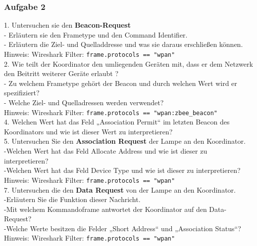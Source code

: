 \subsubsection{Aufgabe 2}
\begin{Fragen}
    1. Untersuchen sie den \textbf{Beacon-Request}\\
    - Erläutern sie den Frametype und den Command Identifier.\\ 
    - Erläutern die Ziel- und Quelladdresse und was sie daraus erschließen können.\\
    Hinweis: Wireshark Filter: \verb|frame.protocols == "wpan"|\\

    2. Wie teilt der Koordinator den umliegenden Geräten mit, dass er dem Netzwerk den Beitritt weiterer Geräte erlaubt ?\\
    - Zu welchem Frametype gehört der Beacon und durch welchen Wert wird er spezifiziert?\\
    - Welche Ziel- und Quelladressen werden verwendet?\\
    Hinweis: Wireshark Filter: \verb|frame.protocols == "wpan:zbee_beacon"|\\
    
    4. Welchen Wert hat das Feld „Association Permit“ im letzten Beacon des Koordinators und wie ist dieser Wert zu interpretieren? \\
    
    5. Untersuchen Sie den \textbf{Association Request} der Lampe an den Koordinator. \\
    -Welchen Wert hat das Feld \grqq Allocate Address \grqq{} und wie ist dieser zu interpretieren?\\
    -Welchen Wert hat das Feld \grqq Device Type\grqq{} und wie ist dieser zu interpretieren?\\
    Hinweis: Wireshark Filter: \verb|frame.protocols == "wpan"|\\
    
    7. Untersuchen die den \textbf{Data Request} von der Lampe an den Koordinator.\\
    -Erläutern Sie die Funktion dieser Nachricht.\\
    -Mit welchem Kommandoframe antwortet der Koordinator auf den Data-Request?\\
    -Welche Werte besitzen die Felder „Short Address“ und „Association Status“?\\
    Hinweis: Wireshark Filter: \verb|frame.protocols == "wpan"|\\


\end{Fragen}
